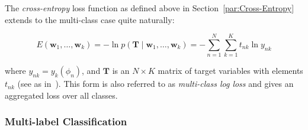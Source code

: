 The \emph{cross-entropy} loss function as defined above in Section~\ref{par:Cross-Entropy} extends to the multi-class case quite naturally:

\begin{equation}
  E(\mathbf{w}_1, \ldots, \mathbf{w}_k) = -\ln p(\mathbf{T} \mid \mathbf{w}_1, \ldots, \mathbf{w}_k) = - \sum_{n=1}^N \sum_{k=1}^K t_{nk} \ln y_{nk}
\end{equation}

where $y_{nk} = y_k (\phi_n)$, and $\mathbf{T}$ is an  $N \times K$ matrix of target variables with elements $t_{nk}$ (see as in~\cite[Chapter 4.3.4, p.~209 ]{Bishop:2006aa}). This form is also referred to as \emph{multi-class log loss} and gives an aggregated loss over all classes. 

\subsubsection*{Multi-label Classification}
\label{subs:Multi-label Classification}

%
%
